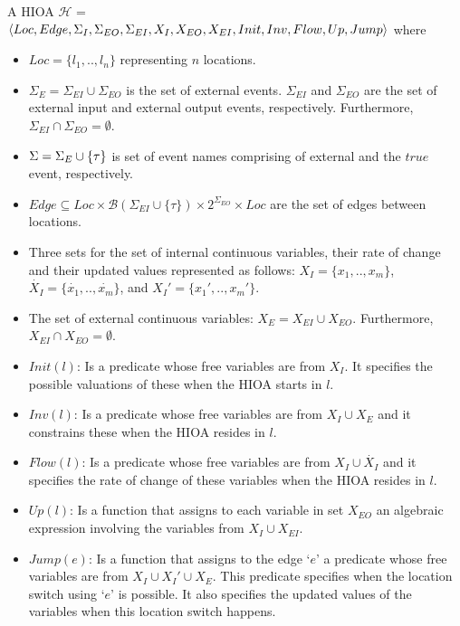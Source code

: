 \begin{definition}
  A \acf{HIOA} \newline $\mathcal{H}$ =
  $\langle Loc, Edge, \Sigma_I, \Sigma_{EO}, \Sigma_{EI}, X_I, X_{EO},
  X_{EI}, \linebreak Init, Inv, Flow, Up, Jump\rangle$ where
  \begin{itemize}
  \item $Loc=\{l_1,..,l_n\}$ representing $n$ locations.
  \item $\Sigma_{E} = \Sigma_{EI} \cup \Sigma_{EO}$ is the set of
    external events. $\Sigma_{EI}$ and $\Sigma_{EO}$ are the set of
    external input and external output events,
    respectively. Furthermore,
    \mbox{$\Sigma_{EI} \cap \Sigma_{EO} = \emptyset$}.
  \item $\Sigma=\Sigma_{E} \cup \{\tau\}$ is set of event names
    comprising of external and the $true$ event, respectively.
  \item
    $Edge \subseteq Loc \times \mathcal{B}(\Sigma_{EI} \cup \{\tau\})
    \times 2^{\Sigma_{EO}} \times Loc$
    are the set of edges between locations.
  \item Three sets for the set of internal continuous variables, their
    rate of change and their updated values represented as follows:
    $X_I=\{x_1,.., x_m\}$, $\dot{X_I}=\{\dot{x_1},.., \dot{x_m}\}$, and
    $X_I'=\{x_{1}',.., x_{m}'\}$.
  \item The set of external continuous variables:
    \mbox{$X_E = X_{EI} \cup X_{EO}$}. Furthermore,
    \mbox{$X_{EI} \cap X_{EO} = \emptyset$}.
  \item $Init(l)$: Is a predicate whose free variables are from
    $X_{I}$. It specifies the possible valuations of these when the HIOA
    starts in $l$.
  \item $Inv(l)$: Is a predicate whose free variables are from
    \mbox{$X_I \cup X_{E}$} and it constrains these when the HIOA
    resides in $l$.
  \item $Flow(l)$: Is a predicate whose free variables are from
    $X_I \cup \dot{X_I}$ and it specifies the rate of change of these
    variables when the HIOA resides in $l$.
  \item $Up(l)$: Is a function that assigns to each variable in set
    $X_{EO}$ an algebraic expression involving the variables from \mbox{$X_{I} 
    \cup X_{EI}$}.
  \item $Jump(e)$: Is a function that assigns to the edge `$e$' a
    predicate whose free variables are from $X_I \cup X_I' \cup X_E$.
    This predicate specifies when the location switch using `$e$' is
    possible. It also specifies the updated values of the variables when
    this location switch happens.
  \end{itemize}
  \label{def:ha}
\end{definition}

